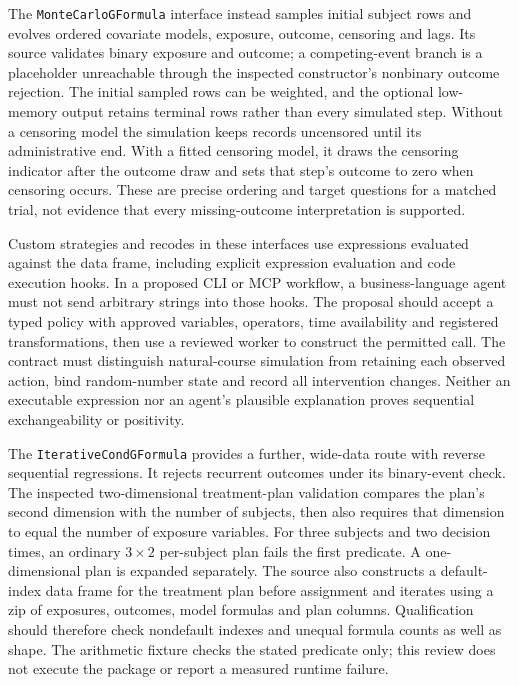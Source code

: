 The \texttt{MonteCarloGFormula} interface instead samples initial subject rows
and evolves ordered covariate models, exposure, outcome, censoring and lags.
Its source validates binary exposure and outcome; a competing-event branch
is a placeholder unreachable through the inspected constructor's nonbinary
outcome rejection. The initial sampled rows can be weighted, and the optional
low-memory output retains terminal rows rather than every simulated step.
Without a censoring model the simulation keeps records uncensored until its
administrative end. With a fitted censoring model, it draws the censoring
indicator after the outcome draw and sets that step's outcome to zero when
censoring occurs. These are precise ordering and target questions for a
matched trial, not evidence that every missing-outcome interpretation is
supported.~\citep{exec24_longpy_zepid_source}

Custom strategies and recodes in these interfaces use expressions evaluated
against the data frame, including explicit expression evaluation and code
execution hooks. In a proposed CLI or MCP workflow, a business-language agent
must not send arbitrary strings into those hooks. The proposal should accept
a typed policy with approved variables, operators, time availability and
registered transformations, then use a reviewed worker to construct the
permitted call. The contract must distinguish natural-course simulation from
retaining each observed action, bind random-number state and record all
intervention changes. Neither an executable expression nor an agent's
plausible explanation proves sequential exchangeability or positivity.
\citep{exec24_longpy_zepid_source}

The \texttt{IterativeCondGFormula} provides a further, wide-data route with
reverse sequential regressions. It rejects recurrent outcomes under its
binary-event check. The inspected two-dimensional treatment-plan validation
compares the plan's second dimension with the number of subjects, then also
requires that dimension to equal the number of exposure variables. For three
subjects and two decision times, an ordinary $3\times2$ per-subject plan
fails the first predicate. A one-dimensional plan is expanded separately.
The source also constructs a default-index data frame for the treatment plan
before assignment and iterates using a zip of exposures, outcomes, model
formulas and plan columns. Qualification should therefore check nondefault
indexes and unequal formula counts as well as shape. The arithmetic fixture
checks the stated predicate only; this review does not execute the package
or report a measured runtime failure.~\citep{exec24_longpy_zepid_source,exec24_longpy_reference}

